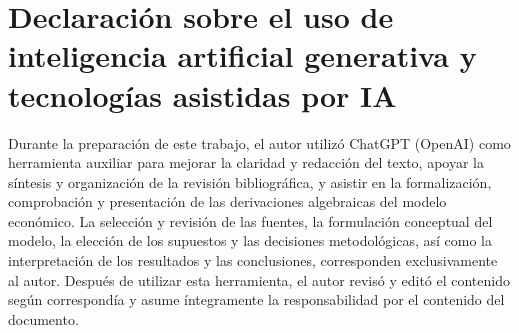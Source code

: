 \section*{Declaración sobre el uso de inteligencia artificial generativa y tecnologías asistidas por IA}

Durante la preparación de este trabajo, el autor utilizó ChatGPT (OpenAI) como herramienta auxiliar para mejorar la claridad y redacción del texto, apoyar la síntesis y organización de la revisión bibliográfica, y asistir en la formalización, comprobación y presentación de las derivaciones algebraicas del modelo económico. La selección y revisión de las fuentes, la formulación conceptual del modelo, la elección de los supuestos y las decisiones metodológicas, así como la interpretación de los resultados y las conclusiones, corresponden exclusivamente al autor. Después de utilizar esta herramienta, el autor revisó y editó el contenido según correspondía y asume íntegramente la responsabilidad por el contenido del documento.